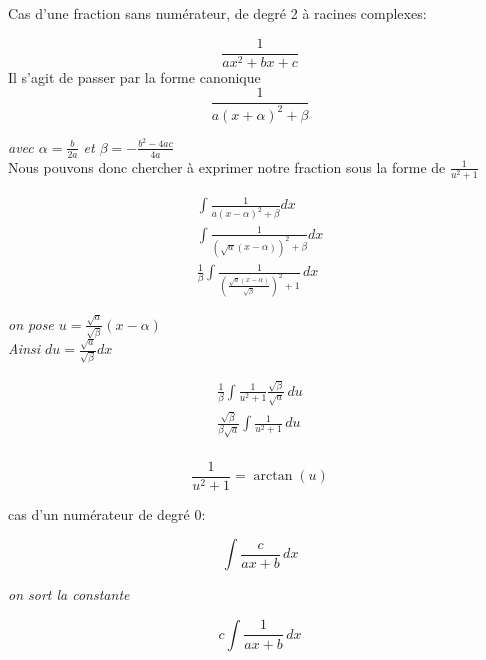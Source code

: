 \documentclass{article}
\newcommand{\smalltext}[1]{
    \scriptsize
    \textit{#1}
    \normalsize
}
\begin{document}
Cas d'une fraction sans numérateur, de degré 2 à racines complexes:
\begin{center}
\begin{equation*}
    \frac{1}{ax^2+bx+c}
\end{equation*}
Il s'agit de passer par la forme canonique
\begin{equation*}
    \frac{1}{a(x+\alpha)^2 + \beta}
\end{equation*}
\smalltext{avec $\alpha = \frac{b}{2a}$ et $\beta = -\frac{b^2 - 4ac}{4a}$} \\

Nous pouvons donc chercher à exprimer notre fraction sous la forme de $\frac{1}{u^2+1}$

\begin{gather*}
    \int \frac{1}{a(x-\alpha)^2 + \beta} dx \\
    \int \frac{1}{(\sqrt{a}(x-\alpha))^2 + \beta} dx \\
    \frac{1}{\beta}\int \frac{1}{(\frac{\sqrt{a}(x-\alpha)}{\sqrt{\beta}})^2 + 1} \, dx
\end{gather*}

\smalltext{on pose $u = \frac{\sqrt{a}}{\sqrt{\beta}}(x-\alpha)$} \\

\smalltext{Ainsi $du = \frac{\sqrt{a}}{\sqrt{\beta}} dx$}
\begin{gather*}
    \frac{1}{\beta} \int \frac{1}{u^2 + 1} \frac{\sqrt{\beta}}{\sqrt{a}} \, du \\
    \frac{\sqrt{\beta}}{\beta\sqrt{a}} \int \frac{1}{u^2 + 1} \, du \\
\end{gather*}

\begin{equation*}
    \frac{1}{u^2+1} = \arctan(u)
\end{equation*}
\end{center}



\hrulefill

cas d'un numérateur de degré 0:

\begin{center}
\begin{equation*}
    \int \frac{c}{ax+b} \, dx
\end{equation*}
\smalltext{on sort la constante}
\begin{equation*}
    c\int \frac{1}{ax+b} \, dx
\end{equation*}
\end{center}
\end{document}
